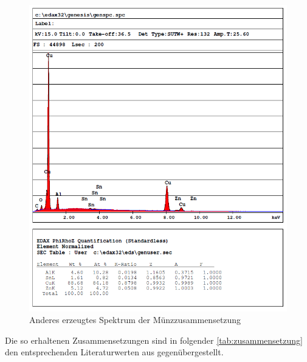 \documentclass[12pt,english,ngerman]{scrartcl}
\begin{document}
\begin{figure}[H]
	\begin{center}
		\includegraphics[width =\textwidth]{./figures/qualitativ2.png}
	\end{center}
	\caption{Anderes erzeugtes Spektrum der Münzzusammensetzung \cite{sein_foto}}
    \label{fig:qualitativ2}
\end{figure}

Die so erhaltenen Zusammensetzungen sind in folgender \autoref{tab:zusammensetzung} den entsprechenden Literaturwerten 
aus \cite{munzen} gegenübergestellt.
\end{document}
